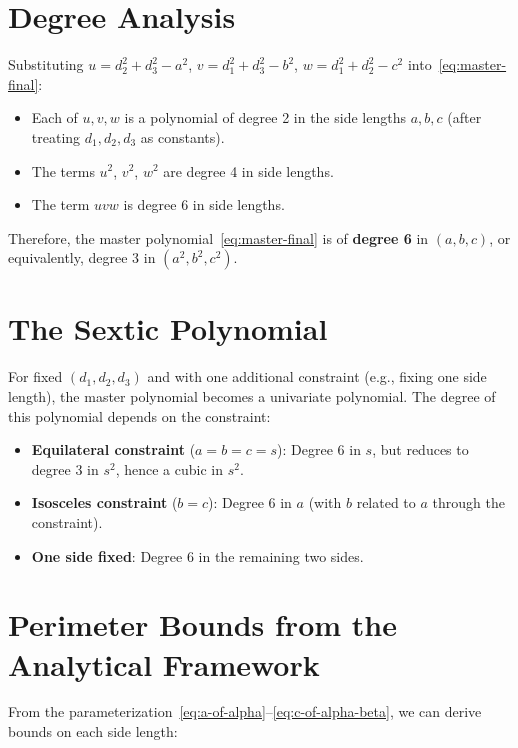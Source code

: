 \section{Degree Analysis}

Substituting $u = d_2^2 + d_3^2 - a^2$, $v = d_1^2 + d_3^2 - b^2$, $w = d_1^2 + d_2^2 - c^2$ into~\eqref{eq:master-final}:

\begin{itemize}
    \item Each of $u, v, w$ is a polynomial of degree 2 in the side lengths $a, b, c$ (after treating $d_1, d_2, d_3$ as constants).
    \item The terms $u^2$, $v^2$, $w^2$ are degree 4 in side lengths.
    \item The term $uvw$ is degree 6 in side lengths.
\end{itemize}

Therefore, the master polynomial~\eqref{eq:master-final} is of \textbf{degree 6} in $(a, b, c)$, or equivalently, degree 3 in $(a^2, b^2, c^2)$.

\section{The Sextic Polynomial}

For fixed $(d_1, d_2, d_3)$ and with one additional constraint (e.g., fixing one side length), the master polynomial becomes a univariate polynomial. The degree of this polynomial depends on the constraint:

\begin{itemize}
    \item \textbf{Equilateral constraint} ($a = b = c = s$): Degree 6 in $s$, but reduces to degree 3 in $s^2$, hence a cubic in $s^2$.
    \item \textbf{Isosceles constraint} ($b = c$): Degree 6 in $a$ (with $b$ related to $a$ through the constraint).
    \item \textbf{One side fixed}: Degree 6 in the remaining two sides.
\end{itemize}

\section{Perimeter Bounds from the Analytical Framework}

From the parameterization~\eqref{eq:a-of-alpha}--\eqref{eq:c-of-alpha-beta}, we can derive bounds on each side length:

